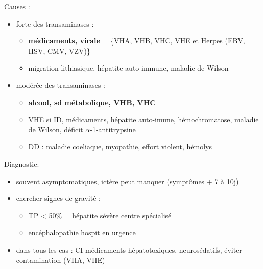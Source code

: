 \documentclass[11pt]{article}
\begin{document}
Causes :
\begin{itemize}
\item \inc{} forte des transaminases : 
\begin{itemize}
\item \textbf{médicaments, virale} = \{VHA, VHB, VHC, VHE et Herpes (EBV, HSV, CMV, VZV)\}
\item migration lithiasique, hépatite auto-immune, maladie de Wilson
\end{itemize}
\item \inc{} modérée des transaminases : 
\begin{itemize}
\item \textbf{alcool, sd métabolique, VHB, VHC}
\item VHE si \gls{ID}, médicaments, hépatite auto-imune, hémochromatose, maladie de
Wilson, déficit \(\alpha\)-1-antitrypsine
\item DD : maladie coeliaque, myopathie, effort violent, hémolys
\end{itemize}
\end{itemize}

Diagnostic: 
\begin{itemize}
\item souvent asymptomatiques, ictère peut manquer (symptômes + 7 à 10j)
\item chercher signes de gravité : 
\begin{itemize}
\item TP < 50\% = hépatite sévère \thus centre spécialisé
\item encéphalopathie \thus hospit en urgence 
\end{itemize}
\item dans tous les cas : CI médicaments hépatotoxiques, neurosédatifs, éviter
contamination (VHA, VHE)
\end{itemize}





\begin{table}
\caption{Hépatites virales, résumé}
\label{tab:my-table}
\centering
{}
\end{table}
\end{document}
